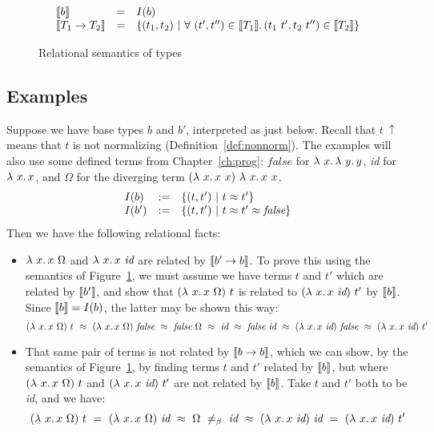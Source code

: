 \begin{figure}
  \[
\begin{array}{lll}
   \llbracket b \rrbracket & = & I(b) \\
   \llbracket T_1\to T_2 \rrbracket & = & \{ (t_1,t_2)\ |\ \forall\ (t', t'') \in \llbracket T_1 \rrbracket.\, (t_1\ t', t_2\ t'') \in\llbracket T_2 \rrbracket \}
\end{array}
  \]
\caption{Relational semantics of types}
\label{fig:relsemstlc}
\end{figure}

\subsection{Examples}

Suppose we have base types $b$ and $b'$, interpreted as just below.
Recall that $t\ \uparrow$ means that $t$ is not normalizing
(Definition~\ref{def:nonnorm}).  The examples will also use some
defined terms from Chapter~\ref{ch:prog}: $\textit{false}$ for
$\lambda\ x.\, \lambda\ y.\, y$, \textit{id} for $\lambda\ x.\, x$, and $\Omega$ for
the diverging term $(\lam{x}{x\ x})\ \lam{x}{x\ x}$.
\[
\begin{array}{lll}
  I(b) & := & \{ (t,t')\ |\ t \approx t' \} \\
  I(b') & := & \{ (t,t')\ |\ t \approx t' \approx \textit{false} \}
\end{array}
\]
\noindent Then we have the following relational facts:
\begin{itemize}
\item $\lambda\ x.\, x\ \Omega$ and $\lambda\ x.\, x\ \textit{id}$ are related
  by $\llbracket b' \to b \rrbracket$.  To prove this using the semantics of
  Figure~\ref{fig:relsemstlc}, we must assume we have terms $t$ and
  $t'$ which are related by $\llbracket b' \rrbracket$, and show that
  $(\lambda\ x.\, x\ \Omega)\ t$ is related to $(\lam{x}{x\ \textit{id}})\ t'$ by
  $\llbracket b \rrbracket$.  Since $\llbracket b \rrbracket = I(b)$, the latter may be shown this
  way:
  \[
  (\lam{x}{x\ \Omega})\ t \ \betaeq \  (\lam{x}{x\ \Omega})\ \textit{false} \ \betaeq \ \textit{false}\ \Omega\ \betaeq\ \textit{id} \ \betaeq\ \textit{false}\ \textit{id}\ \betaeq \ (\lam{x}{x\ \textit{id}})\ \textit{false} \ \betaeq \ (\lam{x}{x\ \textit{id}})\ t'
      \]

 \item That same pair of terms is not related by $\llbracket b \to b \rrbracket$,
      which we can show, by the semantics of Figure~\ref{fig:relsemstlc},
      by finding terms $t$ and $t'$ related by $\llbracket b \rrbracket$, but
      where $(\lambda\ x.\, x\ \Omega)\ t$ and $(\lam{x}{x\ \textit{id}})\ t'$
      are not related by $\llbracket b \rrbracket$.  Take $t$ and $t'$ both to be \textit{id},
      and we have:
     \[
     (\lam{x}{x\ \Omega})\ t\ =\ (\lam{x}{x\ \Omega})\ \textit{id}\ \betaeq\ \Omega \ \neq_\beta\ \textit{id}\ \betaeq\ (\lam{x}{x\ \textit{id}})\ \textit{id}\ = \ (\lam{x}{x\ \textit{id}})\ t'
     \]
     \end{itemize}


